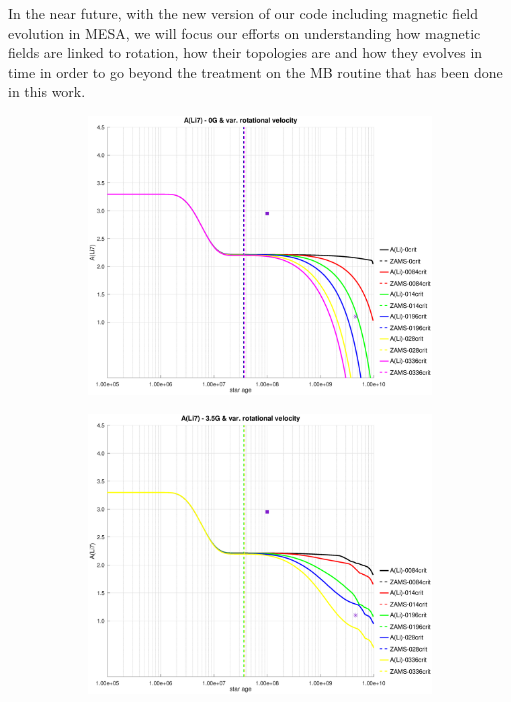 \documentclass[fleqn,usenatbib]{mnras}
\begin{document}
In the near future, with the new version of our code including magnetic field evolution in MESA, we will focus our efforts on understanding how magnetic fields are linked to rotation, how their topologies are and how they evolves in time in order to go beyond the treatment on the MB routine that has been done in this work.\par




\begin{figure}
    \centering
    \begin{subfigure}[h]{0.47\textwidth}
    \includegraphics[trim = 35mm 15mm 20mm 15mm, clip,width=\textwidth]{figures/li_var_vel_0_0g.eps}
    \label{fig:subim1}
    \end{subfigure}
    \begin{subfigure}[h]{0.47\textwidth}
    \includegraphics[trim = 35mm 15mm 20mm 15mm, clip,width=\textwidth]{figures/li_var_vel_3_5g.eps}
    \label{fig:subim2}
    \end{subfigure}
    

\end{figure}
\end{document}
